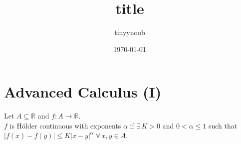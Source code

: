 \documentclass{article}
\title{title}
\author{tinyynoob}
\date{\today}
\begin{document}
\section*{Advanced Calculus (I)}
Let $A\subseteq \mathbb{R}$ and $f:A\to \mathbb{R}$. \\
$f$ is Hölder continuous with exponents $\alpha$ if 
$\exists\, K>0$ and $0<\alpha\leq 1$ such that 
$\left|f(x)-f(y)\right|\leq K\left|x-y\right|^\alpha \;\forall\,x,y\in A$.
\end{document}
